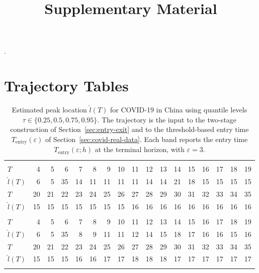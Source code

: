 \documentclass[12pt,a4paper]{article}
\title{\textbf{Supplementary Material}}
\author{}
\date{}
\begin{document}
	\maketitle
	.\appendix
	\section{Trajectory Tables}
	\label{app:trajectories}
	
	\begin{landscape}
		\begin{table}[htbp]
			\caption{Estimated peak location $\hat{l}(T)$ for COVID-19 in China using quantile levels $\tau\in\{0.25,0.5,0.75,0.95\}$. The trajectory is the input to the two-stage construction of Section~\ref{sec:entry-exit} and to the threshold-based entry time $T_{\mathrm{entry}}(\varepsilon)$ of Section~\ref{sec:covid-real-data}. Each band reports the entry time $T_{\mathrm{entry}}(\varepsilon;h)$ at the terminal horizon, with $\varepsilon=3$.}
			\label{tab:china_tau}
			\begin{tabular*}{\linewidth}{@{\extracolsep{\fill}}lrrrrrrrrrrrrrrrr}
				\toprule
				\addlinespace[2.5pt]
				\multicolumn{17}{c}{\textbf{$\tau=0.25,\ T_{\mathrm{entry}}(3)=15$}} \\
				\addlinespace[2.5pt]
				\midrule
				$T$ & 4 & 5 & 6 & 7 & 8 & 9 & 10 & 11 & 12 & 13 & 14 & 15 & 16 & 17 & 18 & 19 \\
				$\hat{l}(T)$ & 6 & 5 & 35 & 14 & 11 & 11 & 11 & 11 & 14 & 14 & 21 & 18 & 15 & 15 & 15 & 15 \\
				$T$ & 20 & 21 & 22 & 23 & 24 & 25 & 26 & 27 & 28 & 29 & 30 & 31 & 32 & 33 & 34 & 35 \\
				$\hat{l}(T)$ & 15 & 15 & 15 & 15 & 15 & 15 & 15 & 16 & 16 & 16 & 16 & 16 & 16 & 16 & 16 & 16 \\
				\midrule\addlinespace[2.5pt]
				\multicolumn{17}{c}{\textbf{$\tau=0.5,\ T_{\mathrm{entry}}(3)=13$}} \\
				\addlinespace[2.5pt]
				\midrule
				$T$ & 4 & 5 & 6 & 7 & 8 & 9 & 10 & 11 & 12 & 13 & 14 & 15 & 16 & 17 & 18 & 19 \\
				$\hat{l}(T)$ & 6 & 5 & 35 & 8 & 9 & 11 & 11 & 12 & 14 & 15 & 18 & 17 & 16 & 16 & 15 & 16 \\
				$T$ & 20 & 21 & 22 & 23 & 24 & 25 & 26 & 27 & 28 & 29 & 30 & 31 & 32 & 33 & 34 & 35 \\
				$\hat{l}(T)$ & 15 & 15 & 15 & 16 & 16 & 17 & 17 & 18 & 18 & 18 & 17 & 17 & 17 & 17 & 17 & 17 \\
				\midrule\addlinespace[2.5pt]

\end{tabular*}
\end{table}
\end{landscape}
\end{document}
